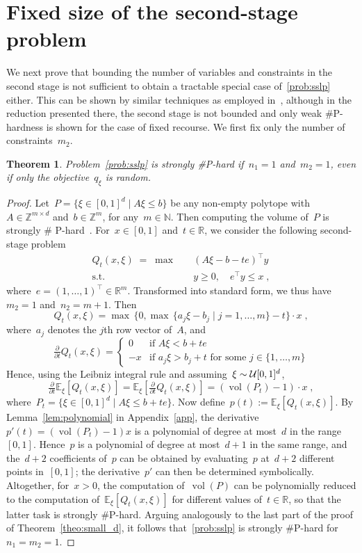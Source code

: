 \documentclass{article}
\newtheorem{theorem}{Theorem}
\newcommand{\N}{\mathbb{N}}
\newcommand{\Z}{\mathbb{Z}}
\newcommand{\R}{\mathbb{R}}
\newcommand{\card}{\#}
\newcommand{\st}{\text{s.t.}}
\newcommand{\E}{\mathbb{E}}
\DeclareMathOperator{\vol}{vol}
\begin{document}
\section{Fixed size of the second-stage problem}\label{sec:fixed_mn}

We next prove that bounding the number of variables and constraints in
the second stage is not sufficient to obtain a tractable special
case of~\eqref{prob:sslp} either. This can be shown by similar techniques as
employed in~\cite{Hanasusanto16}, although in the reduction presented
there, the second stage is not bounded and only weak \card P-hardness
is shown for the case of fixed recourse. We first fix only the number
of constraints~$m_2$.
\begin{theorem}\label{theo:small_m2}
  Problem~\eqref{prob:sslp} is strongly \card P-hard if~$n_1=1$
  and~$m_2=1$, even if only the objective~$q_\xi$ is random.
\end{theorem}
\begin{proof}
  Let~$P=\{\xi\in [0,1]^d\mid A\xi\le b\}$ be any non-empty polytope
  with~$A\in\Z^{m\times d}$ and~$b\in\Z^m$, for any~$m\in\N$. Then
  computing the volume of~$P$ is strongly \card
  P-hard~\cite{Dyer88}. For~$x\in[0,1]$ and~$t\in\R$, we consider the
  following second-stage problem
  \begin{align*}
    Q_{t}(x,\xi) \; = \; \max \quad & (A\xi-b-te)^\top y\\
    \st \quad & y\ge 0,\quad e^\top y\le x\;,
  \end{align*}
  where~$e=(1,\dots,1)^\top\in\R^m$. Transformed into standard form,
  we thus have~$m_2=1$ and~$n_2=m+1$.  Then
  \[
  Q_{t}(x,\xi)=\max\,\{0,\max\,\{a_j \xi-b_j\mid j=1,\dots,m\}-t\}\cdot x\;,
  \]
  where~$a_j$ denotes the $j$th row vector of~$A$, and
  \[
  \tfrac\partial{\partial t} Q_{t}(x,\xi)=\left\{\begin{array}{cl}
  0 & \text{if }A\xi< b+te \\
  -x & \text{if }a_j\xi > b_j+t\text{ for some }j\in\{1,\dots,m\}
  \end{array}\right.
  \]
  Hence, using the Leibniz integral rule and assuming~$\xi\sim{\cal
    U}[0,1]^d$,
  \[
  \tfrac\partial{\partial t} \E_\xi[Q_{t}(x,\xi)]
  = \E_\xi[\tfrac\partial{\partial t} Q_{t}(x,\xi)]
  = (\vol(P_t)-1)\cdot x\;,
  \]
  where~$P_t=\{\xi\in [0,1]^d\mid A\xi\le b+te\}$. Now
  define~$p(t):=\E_\xi[Q_t(x,\xi)]$. By Lemma~\ref{lem:polynomial} in
  Appendix~\ref{app}, the derivative~$p'(t)=(\vol(P_t)-1)x$ is a
  polynomial of degree at most~$d$ in the range~$[0,1]$. Hence~$p$ is a
  polynomial of degree at most~$d+1$ in the same range, and the~$d+2$
  coefficients of~$p$ can be obtained by evaluating~$p$ at~$d+2$
  different points in~$[0,1]$; the derivative~$p'$ can then be
  determined symbolically.  Altogether, for~$x>0$, the computation
  of~$\vol(P)$ can be polynomially reduced to the computation
  of~$\E_\xi[Q_{t}(x,\xi)]$ for different values of~$t\in\R$, so that
  the latter task is strongly \card P-hard. Arguing analogously to the
  last part of the proof of Theorem~\ref{theo:small_d}, it follows
  that~\eqref{prob:sslp} is strongly \card P-hard for~$n_1=m_2=1$.
\end{proof}
\end{document}
